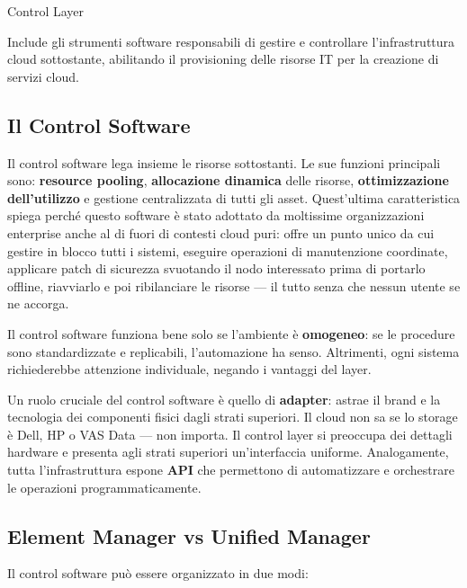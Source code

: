\documentclass[
  italian,
  openany]{book}
\begin{document}
\begin{calloutdefinition}{Control Layer}

Include gli strumenti software responsabili di gestire e controllare
l'infrastruttura cloud sottostante, abilitando il provisioning delle
risorse IT per la creazione di servizi cloud.

\end{calloutdefinition}

\subsection{Il Control Software}\label{il-control-software}

Il control software lega insieme le risorse sottostanti. Le sue funzioni
principali sono: \textbf{resource pooling}, \textbf{allocazione
dinamica} delle risorse, \textbf{ottimizzazione dell'utilizzo} e
gestione centralizzata di tutti gli asset. Quest'ultima caratteristica
spiega perché questo software è stato adottato da moltissime
organizzazioni enterprise anche al di fuori di contesti cloud puri:
offre un punto unico da cui gestire in blocco tutti i sistemi, eseguire
operazioni di manutenzione coordinate, applicare patch di sicurezza
svuotando il nodo interessato prima di portarlo offline, riavviarlo e
poi ribilanciare le risorse --- il tutto senza che nessun utente se ne
accorga.

Il control software funziona bene solo se l'ambiente è
\textbf{omogeneo}: se le procedure sono standardizzate e replicabili,
l'automazione ha senso. Altrimenti, ogni sistema richiederebbe
attenzione individuale, negando i vantaggi del layer.

Un ruolo cruciale del control software è quello di \textbf{adapter}:
astrae il brand e la tecnologia dei componenti fisici dagli strati
superiori. Il cloud non sa se lo storage è Dell, HP o VAS Data --- non
importa. Il control layer si preoccupa dei dettagli hardware e presenta
agli strati superiori un'interfaccia uniforme. Analogamente, tutta
l'infrastruttura espone \textbf{API} che permettono di automatizzare e
orchestrare le operazioni programmaticamente.

\subsection{Element Manager vs Unified
Manager}\label{element-manager-vs-unified-manager}

Il control software può essere organizzato in due modi:
\end{document}
